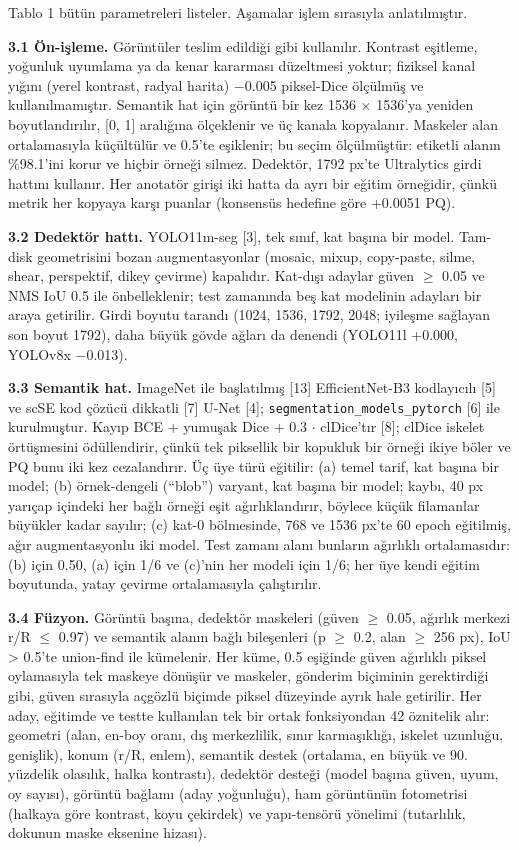 Tablo 1 bütün parametreleri listeler. Aşamalar işlem sırasıyla anlatılmıştır.

\textbf{3.1 Ön-işleme.} Görüntüler teslim edildiği gibi kullanılır. Kontrast eşitleme, yoğunluk
uyumlama ya da kenar kararması düzeltmesi yoktur; fiziksel kanal yığını (yerel kontrast, radyal
harita) $-$0.005 piksel-Dice ölçülmüş ve kullanılmamıştır. Semantik hat için görüntü bir kez
1536 $\times$ 1536'ya yeniden boyutlandırılır, {[}0, 1{]} aralığına ölçeklenir ve üç kanala kopyalanır.
Maskeler alan ortalamasıyla küçültülür ve 0.5'te eşiklenir; bu seçim ölçülmüştür: etiketli alanın
\%98.1'ini korur ve hiçbir örneği silmez. Dedektör, 1792 px'te Ultralytics girdi hattını kullanır.
Her anotatör girişi iki hatta da ayrı bir eğitim örneğidir, çünkü metrik her kopyaya karşı puanlar
(konsensüs hedefine göre +0.0051 PQ).

\textbf{3.2 Dedektör hattı.} YOLO11m-seg {[}3{]}, tek sınıf, kat başına bir model. Tam-disk geometrisini
bozan augmentasyonlar (mosaic, mixup, copy-paste, silme, shear, perspektif, dikey çevirme)
kapalıdır. Kat-dışı adaylar güven $\geq$ 0.05 ve NMS IoU 0.5 ile önbelleklenir; test zamanında beş kat
modelinin adayları bir araya getirilir. Girdi boyutu tarandı (1024, 1536, 1792, 2048; iyileşme
sağlayan son boyut 1792), daha büyük gövde ağları da denendi (YOLO11l +0.000, YOLOv8x $-$0.013).

\textbf{3.3 Semantik hat.} ImageNet ile başlatılmış {[}13{]} EfficientNet-B3 kodlayıcılı {[}5{]} ve scSE kod
çözücü dikkatli {[}7{]} U-Net {[}4{]}; \texttt{segmentation\_models\_pytorch} {[}6{]} ile kurulmuştur. Kayıp
BCE + yumuşak Dice + 0.3 $\cdot$ clDice'tır {[}8{]}; clDice iskelet örtüşmesini ödüllendirir, çünkü tek
piksellik bir kopukluk bir örneği ikiye böler ve PQ bunu iki kez cezalandırır. Üç üye türü
eğitilir: (a) temel tarif, kat başına bir model; (b) örnek-dengeli (``blob'') varyant, kat başına
bir model; kaybı, 40 px yarıçap içindeki her bağlı örneği eşit ağırlıklandırır, böylece küçük
filamanlar büyükler kadar sayılır; (c) kat-0 bölmesinde, 768 ve 1536 px'te 60 epoch eğitilmiş, ağır
augmentasyonlu iki model. Test zamanı alanı bunların ağırlıklı ortalamasıdır: (b) için 0.50,
(a) için 1/6 ve (c)'nin her modeli için 1/6; her üye kendi eğitim boyutunda, yatay çevirme
ortalamasıyla çalıştırılır.

\textbf{3.4 Füzyon.} Görüntü başına, dedektör maskeleri (güven $\geq$ 0.05, ağırlık merkezi r/R $\leq$ 0.97) ve
semantik alanın bağlı bileşenleri (p $\geq$ 0.2, alan $\geq$ 256 px), IoU \textgreater{} 0.5'te union-find ile kümelenir.
Her küme, 0.5 eşiğinde güven ağırlıklı piksel oylamasıyla tek maskeye dönüşür ve maskeler,
gönderim biçiminin gerektirdiği gibi, güven sırasıyla açgözlü biçimde piksel düzeyinde ayrık hale
getirilir. Her aday, eğitimde ve testte kullanılan tek bir ortak fonksiyondan 42 öznitelik alır:
geometri (alan, en-boy oranı, dış merkezlilik, sınır karmaşıklığı, iskelet uzunluğu, genişlik),
konum (r/R, enlem), semantik destek (ortalama, en büyük ve 90. yüzdelik olasılık, halka
kontrastı), dedektör desteği (model başına güven, uyum, oy sayısı), görüntü bağlamı (aday
yoğunluğu), ham görüntünün fotometrisi (halkaya göre kontrast, koyu çekirdek) ve yapı-tensörü
yönelimi (tutarlılık, dokunun maske eksenine hizası).

